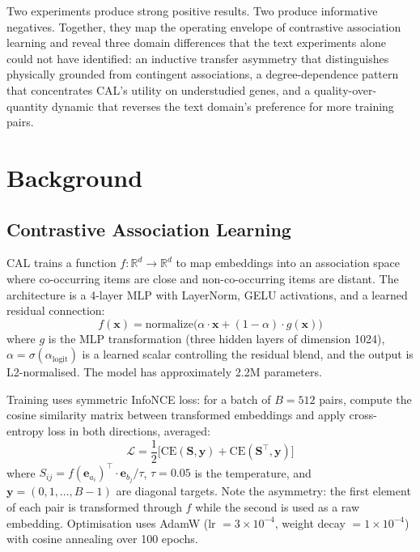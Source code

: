 \documentclass[11pt]{article}
\begin{document}
Two experiments produce strong positive results. Two produce informative negatives. Together, they map the operating envelope of contrastive association learning and reveal three domain differences that the text experiments alone could not have identified: an inductive transfer asymmetry that distinguishes physically grounded from contingent associations, a degree-dependence pattern that concentrates CAL's utility on understudied genes, and a quality-over-quantity dynamic that reverses the text domain's preference for more training pairs.

\section{Background}
\label{sec:background}

\subsection{Contrastive Association Learning}

CAL trains a function $f: \mathbb{R}^d \to \mathbb{R}^d$ to map embeddings into an association space where co-occurring items are close and non-co-occurring items are distant. The architecture is a 4-layer MLP with LayerNorm, GELU activations, and a learned residual connection:
\begin{equation}
f(\mathbf{x}) = \text{normalize}\bigl(\alpha \cdot \mathbf{x} + (1 - \alpha) \cdot g(\mathbf{x})\bigr)
\label{eq:residual}
\end{equation}
where $g$ is the MLP transformation (three hidden layers of dimension 1024), $\alpha = \sigma(\alpha_{\text{logit}})$ is a learned scalar controlling the residual blend, and the output is L2-normalised. The model has approximately 2.2M parameters.

Training uses symmetric InfoNCE loss: for a batch of $B = 512$ pairs, compute the cosine similarity matrix between transformed embeddings and apply cross-entropy loss in both directions, averaged:
\begin{equation}
\mathcal{L} = \frac{1}{2}\bigl[\text{CE}(\mathbf{S}, \mathbf{y}) + \text{CE}(\mathbf{S}^\top, \mathbf{y})\bigr]
\label{eq:loss}
\end{equation}
where $S_{ij} = f(\mathbf{e}_{a_i})^\top \cdot \mathbf{e}_{b_j} / \tau$, $\tau = 0.05$ is the temperature, and $\mathbf{y} = (0, 1, \ldots, B-1)$ are diagonal targets. Note the asymmetry: the first element of each pair is transformed through $f$ while the second is used as a raw embedding. Optimisation uses AdamW (lr $= 3 \times 10^{-4}$, weight decay $= 1 \times 10^{-4}$) with cosine annealing over 100 epochs.
\end{document}
